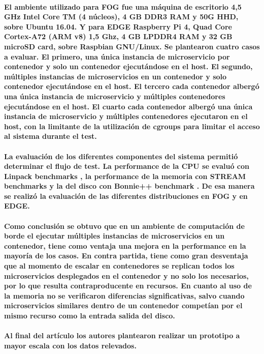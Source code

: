 \paragraph{
  El ambiente utilizado para FOG fue una máquina de escritorio 4,5 GHz Intel Core TM (4 núcleos),
  4 GB DDR3 RAM y 50G HHD, sobre Ubuntu 16.04. Y para EDGE Raspberry Pi 4, Quad Core Cortex-A72 (ARM v8) 1,5 Ghz,
  4 GB LPDDR4 RAM y 32 GB microSD card, sobre Raspbian GNU/Linux.
  Se plantearon cuatro casos a evaluar. El primero, una única instancia de microservicio por contenedor y solo un contenedor ejecutándose en el host.
  El segundo, múltiples instancias de microservicios en un contenedor y solo contenedor ejecutándose en el host. El tercero cada contenedor albergó una única instancia de microservicio y múltiples contenedores ejecutándose en el host. El cuarto cada contenedor albergó una única instancia de microservicio y múltiples contenedores ejecutaron en el host, con la limitante de la utilización de cgroups para limitar el acceso al sistema durante el test.
}

\paragraph{
  La evaluación de los diferentes componentes del sistema permitió determinar el flujo de test.
  La performance de la CPU se evaluó con Linpack benchmarks
  \cite{LINPACKBenchmarksWikipedia}, la performance de la memoria con STREAM benchmarks
  \cite{STREAMBenchmarkAMD}
  y la del disco con Bonnie++ benchmark \cite{BonnieWikipedia}.
  De esa manera se realizó la evaluación de las diferentes distribuciones en FOG y en EDGE.
}

\paragraph{
  Como conclusión se obtuvo que en un ambiente de computación de borde el ejecutar múltiples instancias de microservicios en un contenedor,
  tiene como ventaja una mejora en la performance en la mayoría de los casos.
  En contra partida, tiene como gran desventaja que al momento de escalar en contenedores se replican todos los microservicios desplegados en el contenedor
  y no solo los necesarios, por lo que resulta contraproducente en recursos.
  En cuanto al uso de la memoria no se verificaron diferencias significativas,
  salvo cuando microservicios similares dentro de un contenedor competían por el mismo recurso como la entrada salida del disco.
}

\paragraph{
  Al final del artículo los autores plantearon realizar un prototipo a mayor escala con los datos relevados.
}

